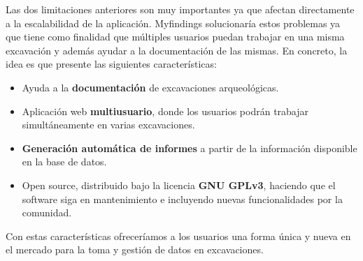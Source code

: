 Las dos limitaciones anteriores son muy importantes ya que afectan directamente a la
escalabilidad de la aplicación. Myfindings solucionaría estos problemas ya que tiene como
finalidad que múltiples usuarios puedan trabajar en una misma excavación y además ayudar a
la documentación de las mismas. En concreto, la idea es que presente las siguientes
características:

    \begin{itemize}
        \item Ayuda a la \textbf{documentación} de excavaciones arqueológicas.
        \item Aplicación web \textbf{multiusuario}, donde los usuarios podrán trabajar
        simultáneamente en varias excavaciones.
        \item \textbf{Generación automática de informes} a partir de la información 
        disponible en la base de datos.
        \item Open source, distribuido bajo la licencia \textbf{GNU GPLv3}, haciendo que
        el software siga en mantenimiento e incluyendo nuevas funcionalidades por la
        comunidad.
    \end{itemize}

Con estas características ofreceríamos a los usuarios una forma única y nueva en el
mercado para la toma y gestión de datos en excavaciones.
